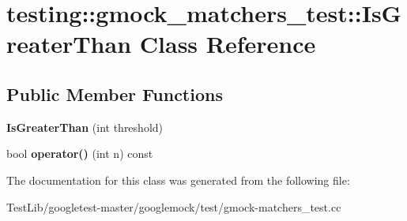 \hypertarget{classtesting_1_1gmock__matchers__test_1_1IsGreaterThan}{}\section{testing\+:\+:gmock\+\_\+matchers\+\_\+test\+:\+:Is\+Greater\+Than Class Reference}
\label{classtesting_1_1gmock__matchers__test_1_1IsGreaterThan}
\subsection*{Public Member Functions}
\begin{DoxyCompactItemize}
\item 
\mbox{\label{classtesting_1_1gmock__matchers__test_1_1IsGreaterThan_a6682979fb1ed5511995e575954d07aaf}} 
{\bfseries Is\+Greater\+Than} (int threshold)
\item 
\mbox{\label{classtesting_1_1gmock__matchers__test_1_1IsGreaterThan_a34b455148a2d299c654bc4443db0af67}} 
bool {\bfseries operator()} (int n) const
\end{DoxyCompactItemize}


The documentation for this class was generated from the following file\+:\begin{DoxyCompactItemize}
\item 
Test\+Lib/googletest-\/master/googlemock/test/gmock-\/matchers\+\_\+test.\+cc\end{DoxyCompactItemize}
